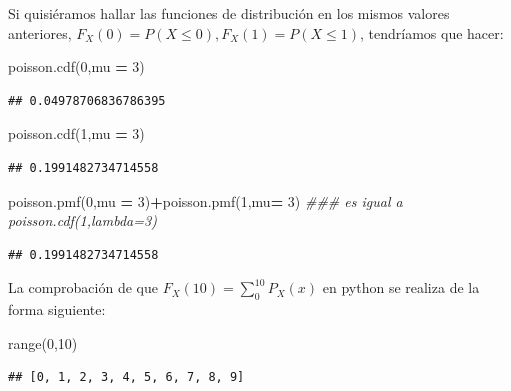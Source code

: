 \documentclass[]{book}
\newenvironment{Shaded}{\begin{snugshade}}{\end{snugshade}}
\newcommand{\BuiltInTok}[1]{#1}
\newcommand{\CommentTok}[1]{\textcolor[rgb]{0.56,0.35,0.01}{\textit{#1}}}
\newcommand{\DecValTok}[1]{\textcolor[rgb]{0.00,0.00,0.81}{#1}}
\newcommand{\NormalTok}[1]{#1}
\newcommand{\OperatorTok}[1]{\textcolor[rgb]{0.81,0.36,0.00}{\textbf{#1}}}
\begin{document}
Si quisiéramos hallar las funciones de distribución en los mismos valores anteriores,
\(F_X(0)=P(X\leq 0), F_X(1)=P(X\leq 1)\), tendríamos que hacer:

\begin{Shaded}
\begin{Highlighting}[]
\NormalTok{poisson.cdf(}\DecValTok{0}\NormalTok{,mu }\OperatorTok{=} \DecValTok{3}\NormalTok{)}
\end{Highlighting}
\end{Shaded}

\begin{verbatim}
## 0.04978706836786395
\end{verbatim}

\begin{Shaded}
\begin{Highlighting}[]
\NormalTok{poisson.cdf(}\DecValTok{1}\NormalTok{,mu }\OperatorTok{=} \DecValTok{3}\NormalTok{)}
\end{Highlighting}
\end{Shaded}

\begin{verbatim}
## 0.1991482734714558
\end{verbatim}

\begin{Shaded}
\begin{Highlighting}[]
\NormalTok{poisson.pmf(}\DecValTok{0}\NormalTok{,mu }\OperatorTok{=} \DecValTok{3}\NormalTok{)}\OperatorTok{+}\NormalTok{poisson.pmf(}\DecValTok{1}\NormalTok{,mu}\OperatorTok{=} \DecValTok{3}\NormalTok{) }\CommentTok{### es igual a poisson.cdf(1,lambda=3)}
\end{Highlighting}
\end{Shaded}

\begin{verbatim}
## 0.1991482734714558
\end{verbatim}

La comprobación de que \(F_X(10)=\displaystyle\sum_{0}^{10} P_X(x)\) en python se realiza de la forma siguiente:

\begin{Shaded}
\begin{Highlighting}[]
\BuiltInTok{range}\NormalTok{(}\DecValTok{0}\NormalTok{,}\DecValTok{10}\NormalTok{)}
\end{Highlighting}
\end{Shaded}

\begin{verbatim}
## [0, 1, 2, 3, 4, 5, 6, 7, 8, 9]
\end{verbatim}
\end{document}
